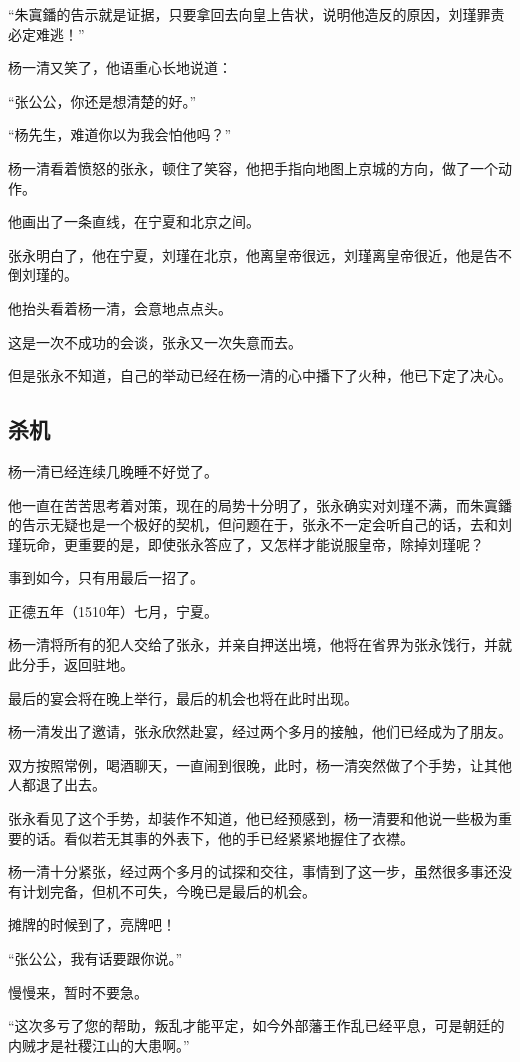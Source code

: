 \begin{multicols}{\theparacolNo}
“朱寘鐇的告示就是证据，只要拿回去向皇上告状，说明他造反的原因，刘瑾罪责必定难逃！”

杨一清又笑了，他语重心长地说道：

“张公公，你还是想清楚的好。”

“杨先生，难道你以为我会怕他吗？”

杨一清看着愤怒的张永，顿住了笑容，他把手指向地图上京城的方向，做了一个动作。

他画出了一条直线，在宁夏和北京之间。

张永明白了，他在宁夏，刘瑾在北京，他离皇帝很远，刘瑾离皇帝很近，他是告不倒刘瑾的。

他抬头看着杨一清，会意地点点头。

这是一次不成功的会谈，张永又一次失意而去。

但是张永不知道，自己的举动已经在杨一清的心中播下了火种，他已下定了决心。

\subsection{杀机}
杨一清已经连续几晚睡不好觉了。

他一直在苦苦思考着对策，现在的局势十分明了，张永确实对刘瑾不满，而朱寘鐇的告示无疑也是一个极好的契机，但问题在于，张永不一定会听自己的话，去和刘瑾玩命，更重要的是，即使张永答应了，又怎样才能说服皇帝，除掉刘瑾呢？

事到如今，只有用最后一招了。

正德五年（1510年）七月，宁夏。

杨一清将所有的犯人交给了张永，并亲自押送出境，他将在省界为张永饯行，并就此分手，返回驻地。

最后的宴会将在晚上举行，最后的机会也将在此时出现。

杨一清发出了邀请，张永欣然赴宴，经过两个多月的接触，他们已经成为了朋友。

双方按照常例，喝酒聊天，一直闹到很晚，此时，杨一清突然做了个手势，让其他人都退了出去。

张永看见了这个手势，却装作不知道，他已经预感到，杨一清要和他说一些极为重要的话。看似若无其事的外表下，他的手已经紧紧地握住了衣襟。

杨一清十分紧张，经过两个多月的试探和交往，事情到了这一步，虽然很多事还没有计划完备，但机不可失，今晚已是最后的机会。

摊牌的时候到了，亮牌吧！

“张公公，我有话要跟你说。”

慢慢来，暂时不要急。

“这次多亏了您的帮助，叛乱才能平定，如今外部藩王作乱已经平息，可是朝廷的内贼才是社稷江山的大患啊。”


\end{multicols}
